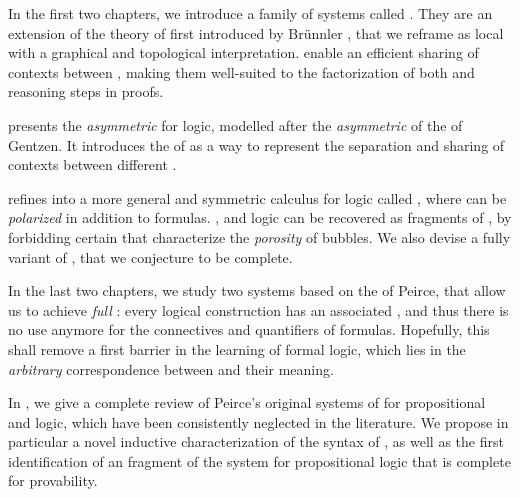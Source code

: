 \begin{description}
   In the first two chapters, we introduce a family of
  systems called . They are an extension of the theory of
   first introduced by Brünnler
  , that we reframe as local 
  with a graphical and topological interpretation.  enable an
  efficient sharing of contexts between , making them well-suited
  to the factorization of both  and  reasoning steps in
  proofs.

  \AP
   presents the \emph{asymmetric}  
  for  logic, modelled after the \emph{asymmetric}  of the    of Gentzen. It
  introduces the  of  as a way to 
  represent the separation and sharing of contexts between different
  .

  \AP
   refines  into a more general and symmetric
  calculus for  logic called , where 
  can be \emph{polarized} in addition to formulas. ,
   and  logic can be recovered as
  fragments of , by forbidding certain  that
  characterize the \emph{porosity} of bubbles. We also devise a fully 
  variant of , that we conjecture to be complete.
  
  \item[Existential graphs] In the last two chapters, we study two systems based
  on the  of Peirce, that allow us to achieve \emph{full
  }: every logical construction has an associated , and thus there
  is no use anymore for the connectives and quantifiers of  formulas.
  Hopefully, this shall remove a first barrier in the learning of formal logic,
  which lies in the \emph{arbitrary} correspondence between  and their
  meaning.

  In , we give a complete review of Peirce's original systems of
   for propositional and   logic, which
  have been consistently neglected in the 
  literature.
  We propose in particular a novel inductive characterization of the syntax of
  , as well as the first identification of an \emph{}
  fragment of the system for propositional logic that is complete for
  provability.


\end{description}
